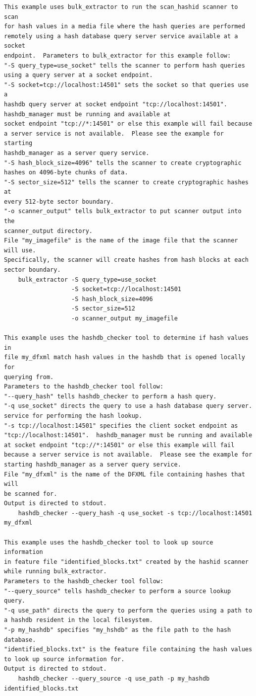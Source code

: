 \documentclass[11pt,twoside]{article}
\begin{document}
\begin{small}
\begin{verbatim}
This example uses bulk_extractor to run the scan_hashid scanner to scan
for hash values in a media file where the hash queries are performed
remotely using a hash database query server service available at a socket
endpoint.  Parameters to bulk_extractor for this example follow:
"-S query_type=use_socket" tells the scanner to perform hash queries
using a query server at a socket endpoint.
"-S socket=tcp://localhost:14501" sets the socket so that queries use a
hashdb query server at socket endpoint "tcp://localhost:14501".
hashdb_manager must be running and available at
socket endpoint "tcp://*:14501" or else this example will fail because
a server service is not available.  Please see the example for starting
hashdb_manager as a server query service.
"-S hash_block_size=4096" tells the scanner to create cryptographic
hashes on 4096-byte chunks of data.
"-S sector_size=512" tells the scanner to create cryptographic hashes at
every 512-byte sector boundary.
"-o scanner_output" tells bulk_extractor to put scanner output into the
scanner_output directory.
File "my_imagefile" is the name of the image file that the scanner will use.
Specifically, the scanner will create hashes from hash blocks at each
sector boundary.
    bulk_extractor -S query_type=use_socket
                   -S socket=tcp://localhost:14501
                   -S hash_block_size=4096
                   -S sector_size=512
                   -o scanner_output my_imagefile

This example uses the hashdb_checker tool to determine if hash values in
file my_dfxml match hash values in the hashdb that is opened locally for
querying from.
Parameters to the hashdb_checker tool follow:
"--query_hash" tells hashdb_checker to perform a hash query.
"-q use_socket" directs the query to use a hash database query server.
service for performing the hash lookup.
"-s tcp://localhost:14501" specifies the client socket endpoint as
"tcp://localhost:14501".  hashdb_manager must be running and available
at socket endpoint "tcp://*:14501" or else this example will fail
because a server service is not available.  Please see the example for
starting hashdb_manager as a server query service.
File "my_dfxml" is the name of the DFXML file containing hashes that will
be scanned for.
Output is directed to stdout.
    hashdb_checker --query_hash -q use_socket -s tcp://localhost:14501 my_dfxml

This example uses the hashdb_checker tool to look up source information
in feature file "identified_blocks.txt" created by the hashid scanner
while running bulk_extractor.
Parameters to the hashdb_checker tool follow:
"--query_source" tells hashdb_checker to perform a source lookup query.
"-q use_path" directs the query to perform the queries using a path to
a hashdb resident in the local filesystem.
"-p my_hashdb" specifies "my_hshdb" as the file path to the hash database.
"identified_blocks.txt" is the feature file containing the hash values
to look up source information for.
Output is directed to stdout.
    hashdb_checker --query_source -q use_path -p my_hashdb identified_blocks.txt


\end{verbatim}
\end{small}
\end{document}
